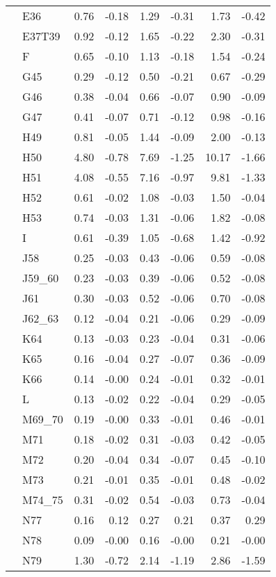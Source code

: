 \begin{tabular}{llrrrrrr}
 & E36 & 0.76 & -0.18 & 1.29 & -0.31 & 1.73 & -0.42 \\
 & E37T39 & 0.92 & -0.12 & 1.65 & -0.22 & 2.30 & -0.31 \\
 & F & 0.65 & -0.10 & 1.13 & -0.18 & 1.54 & -0.24 \\
 & G45 & 0.29 & -0.12 & 0.50 & -0.21 & 0.67 & -0.29 \\
 & G46 & 0.38 & -0.04 & 0.66 & -0.07 & 0.90 & -0.09 \\
 & G47 & 0.41 & -0.07 & 0.71 & -0.12 & 0.98 & -0.16 \\
 & H49 & 0.81 & -0.05 & 1.44 & -0.09 & 2.00 & -0.13 \\
 & H50 & 4.80 & -0.78 & 7.69 & -1.25 & 10.17 & -1.66 \\
 & H51 & 4.08 & -0.55 & 7.16 & -0.97 & 9.81 & -1.33 \\
 & H52 & 0.61 & -0.02 & 1.08 & -0.03 & 1.50 & -0.04 \\
 & H53 & 0.74 & -0.03 & 1.31 & -0.06 & 1.82 & -0.08 \\
 & I & 0.61 & -0.39 & 1.05 & -0.68 & 1.42 & -0.92 \\
 & J58 & 0.25 & -0.03 & 0.43 & -0.06 & 0.59 & -0.08 \\
 & J59\_60 & 0.23 & -0.03 & 0.39 & -0.06 & 0.52 & -0.08 \\
 & J61 & 0.30 & -0.03 & 0.52 & -0.06 & 0.70 & -0.08 \\
 & J62\_63 & 0.12 & -0.04 & 0.21 & -0.06 & 0.29 & -0.09 \\
 & K64 & 0.13 & -0.03 & 0.23 & -0.04 & 0.31 & -0.06 \\
 & K65 & 0.16 & -0.04 & 0.27 & -0.07 & 0.36 & -0.09 \\
 & K66 & 0.14 & -0.00 & 0.24 & -0.01 & 0.32 & -0.01 \\
 & L & 0.13 & -0.02 & 0.22 & -0.04 & 0.29 & -0.05 \\
 & M69\_70 & 0.19 & -0.00 & 0.33 & -0.01 & 0.46 & -0.01 \\
 & M71 & 0.18 & -0.02 & 0.31 & -0.03 & 0.42 & -0.05 \\
 & M72 & 0.20 & -0.04 & 0.34 & -0.07 & 0.45 & -0.10 \\
 & M73 & 0.21 & -0.01 & 0.35 & -0.01 & 0.48 & -0.02 \\
 & M74\_75 & 0.31 & -0.02 & 0.54 & -0.03 & 0.73 & -0.04 \\
 & N77 & 0.16 & 0.12 & 0.27 & 0.21 & 0.37 & 0.29 \\
 & N78 & 0.09 & -0.00 & 0.16 & -0.00 & 0.21 & -0.00 \\
 & N79 & 1.30 & -0.72 & 2.14 & -1.19 & 2.86 & -1.59 \\

\end{tabular}
